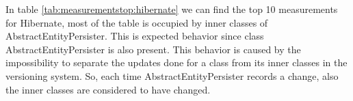 \documentclass[12pt]{mitthesis}
\begin{document}
In table \ref{tab:measurementstop:hibernate} we can find the top 10 measurements for Hibernate, most of the table is occupied by inner classes of AbstractEntityPersister. This is expected behavior since class AbstractEntityPersister is also present. This behavior is caused by the impossibility to separate the updates done for a class from its inner classes in the versioning system. So, each time AbstractEntityPersister records a change, also the inner classes are considered to have changed.
\begin{table}[!h]
\renewcommand{\arraystretch}{1}
\caption{Top 10 measurements for Ant. }
\label{tab:measurementstop:ant}
\centering
{}
\end{table}
\end{document}
